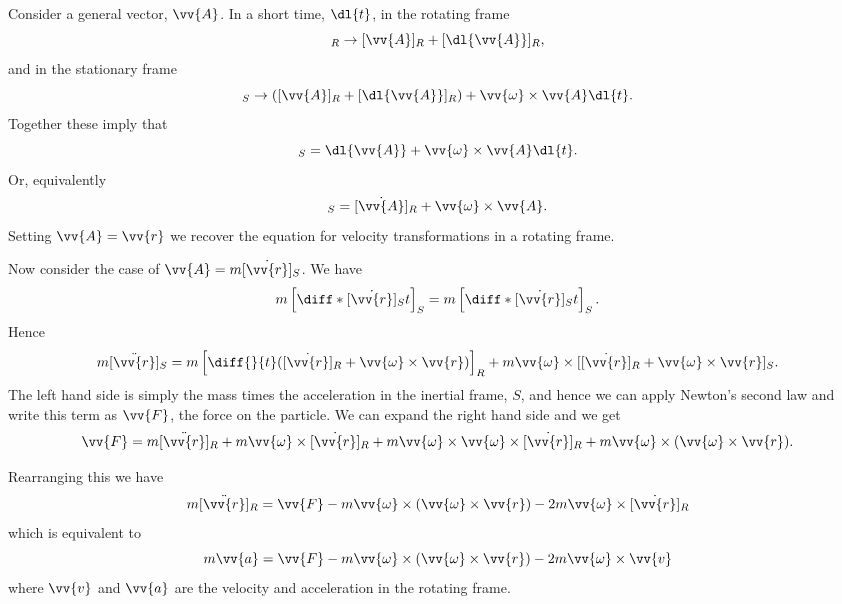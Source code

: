 \documentclass[fleqn]{NotesClass}
\begin{document}
    Consider a general vector, \(\vv{A}\).
    In a short time, \(\dl{t}\), in the rotating frame
    \begin{equation}
        [\vv{A}]_R \to [\vv{A}]_R + [\dl{\vv{A}}]_R,
    \end{equation}
    and in the stationary frame
    \begin{equation}
        [\vv{A}]_S \to ([\vv{A}]_R + [\dl{\vv{A}}]_R) + \vv{\omega}\times\vv{A}\dl{t}.
    \end{equation}
    Together these imply that
    \begin{equation}
        [\dl{\vv{A}}]_S = \dl{\vv{A}} + \vv{\omega}\times\vv{A}\dl{t}.
    \end{equation}
    Or, equivalently
    \begin{equation}
        [\dot{\vv{A}}]_S = [\dot{\vv{A}}]_R + \vv{\omega}\times\vv{A}.
    \end{equation}
    Setting \(\vv{A} = \vv{r}\) we recover the equation for velocity transformations in a rotating frame.
    
    Now consider the case of \(\vv{A} = m[\dot{\vv{r}}]_S\).
    We have
    \begin{align}
        m\left[ \diff*{[\dot{\vv{r}}]_S}{t} \right]_S = m\left[ \diff*{[\dot{\vv{r}}]_S}{t} \right]_S.
    \end{align}
    Hence
    \begin{equation}
        m[\ddot{\vv{r}}]_S = m\left[ \diff{}{t}([\dot{\vv{r}}]_R + \vv{\omega}\times\vv{r}) \right]_R + m\vv{\omega} \times [[\dot{\vv{r}}]_R + \vv{\omega}\times\vv{r}]_S.
    \end{equation}
    The left hand side is simply the mass times the acceleration in the inertial frame, \(S\), and hence we can apply Newton's second law and write this term as \(\vv{F}\), the force on the particle.
    We can expand the right hand side and we get
    \begin{equation}
        \vv{F} = m[\ddot{\vv{r}}]_R + m\vv{\omega}\times[\dot{\vv{r}}]_R + m\vv{\omega}\times\vv{\omega}\times[\dot{\vv{r}}]_R + m\vv{\omega}\times(\vv{\omega}\times\vv{r}).
    \end{equation}
    
    Rearranging this we have
    \begin{equation}
        m[\ddot{\vv{r}}]_R = \vv{F} - m\vv{\omega}\times(\vv{\omega}\times\vv{r}) - 2m\vv{\omega}\times[\dot{\vv{r}}]_R
    \end{equation}
    which is equivalent to
    \begin{equation}
        m\vv{a} = \vv{F} - m\vv{\omega}\times(\vv{\omega} \times \vv{r}) - 2m\vv{\omega}\times\vv{v}
    \end{equation}
    where \(\vv{v}\) and \(\vv{a}\) are the velocity and acceleration in the rotating frame.
    
\end{document}
